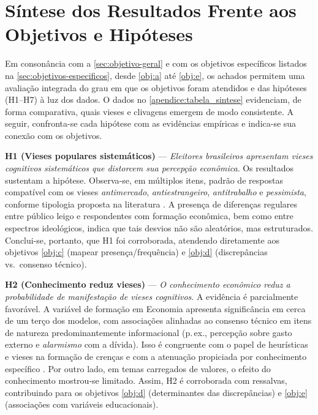 \section{Síntese dos Resultados Frente aos Objetivos e Hipóteses}\label{sec:sintese-resultados}

Em consonância com a \autoref{sec:objetivo-geral} e com os objetivos específicos listados na \autoref{sec:objetivos-especificos}, desde \autoref{obj:a} até \autoref{obj:e}, os achados permitem uma avaliação integrada do grau em que os objetivos foram atendidos e das hipóteses (H1–H7) à luz dos dados. O dados no \autoref{apendice:tabela_sintese} evidenciam, de forma comparativa, quais vieses e clivagens emergem de modo consistente. A seguir, confronta-se cada hipótese com as evidências empíricas e indica-se sua conexão com os objetivos.

\textbf{H1 (Vieses populares sistemáticos)} — \textit{Eleitores brasileiros apresentam vieses cognitivos sistemáticos que distorcem sua percepção econômica}. Os resultados sustentam a hipótese. Observa-se, em múltiplos itens, padrão de respostas compatível com os vieses \emph{antimercado}, \emph{antiestrangeiro}, \emph{antitrabalho} e \emph{pessimista}, conforme tipologia proposta na literatura \cite{The_Myth_of_the_Rational_Voter}. A presença de diferenças regulares entre público leigo e respondentes com formação econômica, bem como entre espectros ideológicos, indica que tais desvios não são aleatórios, mas estruturados. Conclui-se, portanto, que H1 foi corroborada, atendendo diretamente aos objetivos \autoref{obj:c} (mapear presença/frequência) e \autoref{obj:d} (discrepâncias vs.\ consenso técnico).

\textbf{H2 (Conhecimento reduz vieses)} — \textit{O conhecimento econômico reduz a probabilidade de manifestação de vieses cognitivos}. A evidência é parcialmente favorável. A variável de formação em Economia apresenta significância em cerca de um terço dos modelos, com associações alinhadas ao consenso técnico em itens de natureza predominantemente informacional (p.\,ex., percepção sobre gasto externo e \emph{alarmismo} com a dívida). Isso é congruente com o papel de heurísticas e vieses na formação de crenças e com a atenuação propiciada por conhecimento específico \cite{kahneman2011thinking,Judgment_under_Uncertainty, The_Myth_of_the_Rational_Voter}. Por outro lado, em temas carregados de valores, o efeito do conhecimento mostrou-se limitado. Assim, H2 é corroborada com ressalvas, contribuindo para os objetivos \autoref{obj:d} (determinantes das discrepâncias) e \autoref{obj:e} (associações com variáveis educacionais).

